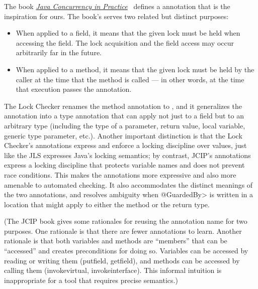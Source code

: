 The book \href{http://jcip.net/}{\emph{Java Concurrency in Practice}}~\cite{Goetz2006} defines a
\href{http://jcip.net.s3-website-us-east-1.amazonaws.com/annotations/doc/net/jcip/annotations/GuardedBy.html}{} annotation that is the inspiration for ours.  The book's
 serves two related but distinct purposes:

\begin{itemize}
\item
  When applied to a field, it means that the given lock must be held when
  accessing the field.  The lock acquisition and the field access may occur
  arbitrarily far in the future.
\item
  When applied to a method, it means that the given lock must be held by
  the caller at the time that the method is called --- in other words, at
  the time that execution passes the  annotation.
\end{itemize}

The Lock Checker renames the method annotation to
, and it generalizes the
 annotation into a type annotation
that can apply not just to a field but to an arbitrary type (including the
type of a parameter, return value, local variable, generic type parameter,
etc.).  Another important distinction is that the Lock Checker's
annotations express and enforce a locking discipline over values, just like
the JLS expresses Java's locking semantics; by contrast, JCIP's annotations
express a locking discipline that protects variable names and does not
prevent race conditions.
  This makes the annotations more expressive and also more amenable
to automated checking.  It also accommodates the distinct
meanings of the two annotations, and resolves ambiguity when \<@GuardedBy>
is written in a location that might apply to either the method or the
return type.

(The JCIP book gives some rationales for reusing the annotation name for
two purposes.  One rationale is
that there are fewer annotations to learn.  Another rationale is
that both variables and methods are ``members'' that can be ``accessed''
and  creates preconditions for doing so.
Variables can be accessed by reading or writing them (putfield, getfield),
and methods can be accessed by calling them (invokevirtual,
invokeinterface).  This informal intuition is
inappropriate for a tool that requires precise semantics.)



